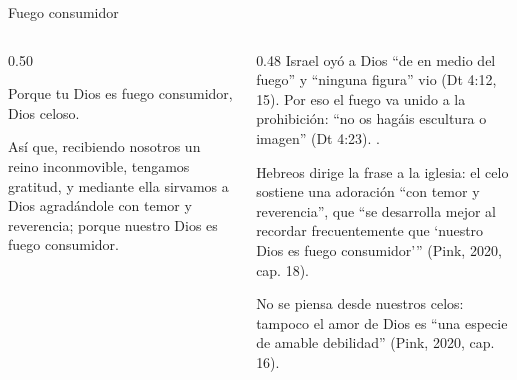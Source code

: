 \begin{frame}{Fuego consumidor}
\begin{columns}[t,onlytextwidth]
\begin{column}{0.50\textwidth}
\begin{cita}Porque \SENOR{} tu Dios es fuego consumidor, Dios celoso.\end{cita}
\begin{center}\end{center}
\begin{cita}Así que, recibiendo nosotros un reino inconmovible, tengamos gratitud, y mediante ella sirvamos a Dios agradándole con temor y reverencia; porque nuestro Dios es fuego consumidor.\end{cita}
\end{column}
\begin{column}{0.48\textwidth}\small
Israel oyó a Dios ``de en medio del fuego'' y ``ninguna figura'' vio (Dt 4:12, 15). Por eso el fuego va unido a la prohibición: ``no os hagáis escultura o imagen'' (Dt 4:23). .\par\medskip
Hebreos dirige la frase a la iglesia: el celo sostiene una adoración ``con temor y reverencia'', que ``se desarrolla mejor al recordar frecuentemente que `nuestro Dios es fuego consumidor'{}'' (Pink, 2020, cap. 18).\par\medskip
No se piensa desde nuestros celos: tampoco el amor de Dios es ``una especie de amable debilidad'' (Pink, 2020, cap. 16).
\end{column}
\end{columns}
\end{frame}

